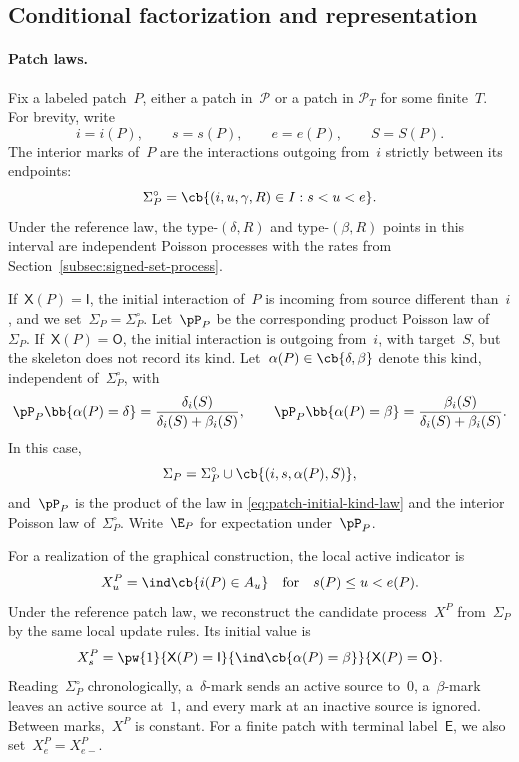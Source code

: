 \subsection{Conditional factorization and representation}
\label{sec:representation}

\paragraph{Patch laws.}
\label{subsec:patch-laws}

Fix a labeled patch~$P$, either a patch in~$\mathcal P$ or a patch in
$\mathcal P_T$ for some finite~$T$. For brevity, write
\begin{equation*}
i=i(P),
\qquad
s=s(P),
\qquad
e=e(P),
\qquad
S=S(P).
\end{equation*}
The interior marks of~$P$ are the interactions outgoing
from~$i$ strictly between its endpoints:
\begin{equation*}
\Sigma_P^\circ
=
\cb{(i,u,\gamma,R)\in I:s<u<e}.
\end{equation*}
Under the reference law, the type-$(\delta,R)$ and type-$(\beta,R)$ points in
this interval are independent Poisson processes with the rates from
Section~\ref{subsec:signed-set-process}.

If~$\mathsf X(P)=\mathsf I$, the initial interaction of~$P$ is incoming from source different than~$i$, and we set~$\Sigma_P=\Sigma_P^\circ$. Let~$\pP_P$ be the
corresponding product Poisson law of~$\Sigma_P$. If~$\mathsf X(P)=\mathsf O$, the initial
interaction is outgoing from~$i$, with target~$S$, but the skeleton does not
record its kind. Let~$\alpha(P)\in\cb{\delta,\beta}$ denote this kind,
independent of~$\Sigma_P^\circ$, with
\begin{equation}
\label{eq:patch-initial-kind-law}
\pP_P\bb{\alpha(P)=\delta}
=
\frac{\delta_i(S)}{\delta_i(S)+\beta_i(S)},
\qquad
\pP_P\bb{\alpha(P)=\beta}
=
\frac{\beta_i(S)}{\delta_i(S)+\beta_i(S)}.
\end{equation}
In this case,
\begin{equation*}
\Sigma_P
=
\Sigma_P^\circ\cup\cb{(i,s,\alpha(P),S)},
\end{equation*}
and~$\pP_P$ is the product of the law in
\eqref{eq:patch-initial-kind-law} and the interior Poisson law of~$\Sigma_P^{\circ}$.
Write~$\E_P$ for expectation under~$\pP_P$.

For a realization of the graphical construction, the local active indicator is
\begin{equation*}
    X_u^P=\ind\cb{i(P)\in A_u} \quad\text{for}\quad s(P)\leq u<e(P). 
\end{equation*}
Under the reference patch
law, we reconstruct the candidate process~$X^P$ from~$\Sigma_P$ by the same
local update rules. Its initial value is
\begin{equation*}
X_s^P
=
\pw{1}{\mathsf X(P)=\mathsf I}
{\ind\cb{\alpha(P)=\beta}}{\mathsf X(P)=\mathsf O}.
\end{equation*}
Reading~$\Sigma_P^\circ$ chronologically, a~$\delta$-mark sends an active
source to~$0$, a~$\beta$-mark leaves an active source at~$1$, and every mark at
an inactive source is ignored. Between marks,~$X^P$ is constant. For a finite
patch with terminal label~$\mathsf E$, we also set~$X_e^P=X_{e-}^P$.

